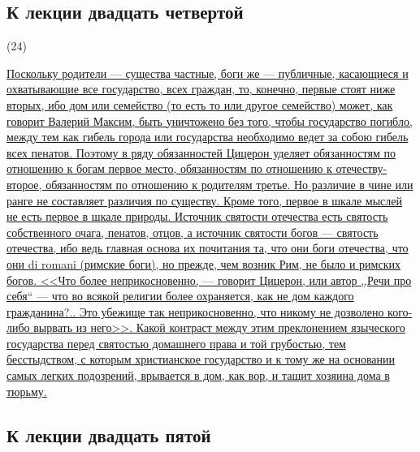 \documentclass[12pt]{article}
\begin{document}
{}
\subsection*{К лекции двадцать четвертой}

\hypertarget{24}{(24)} \hyperlink{b24}{Поскольку родители --- существа частные, боги же --- публичные, касающиеся и охватывающие все государство, всех граждан, то, конечно, первые стоят ниже вторых, ибо дом или семейство (то есть то или другое семейство) может, как говорит Валерий Максим, быть уничтожено без того, чтобы государство погибло, между тем как гибель города или государства необходимо ведет за собою гибель всех пенатов. Поэтому в ряду обязанностей Цицерон уделяет обязанностям по отношению к богам первое место, обязанностям по отношению к отечеству- второе, обязанностям по отношению к родителям третье. Но различие в чине или ранге не составляет различия по существу. Кроме того, первое в шкале мыслей не есть первое в шкале природы. Источник святости отечества есть святость собственного очага, пенатов, отцов, а источник святости богов --- святость отечества, ибо ведь главная основа их почитания та, что они боги отечества, что они di romani (римские боги), но прежде, чем возник Рим, не было и римских богов. <<Что более неприкосновенно, --- говорит Цицерон, или автор ,,Речи про себя``  --- что во всякой религии более охраняется, как не дом каждого гражданина?.. Это убежище так неприкосновенно, что никому не дозволено кого-либо вырвать из него>>. Какой контраст между этим преклонением языческого государства перед святостью домашнего права и той грубостью, тем бесстыдством, с которым христианское государство и к тому же на основании самых легких подозрений, врывается в дом, как вор, и тащит хозяина дома в тюрьму.}

{}
\subsection*{К лекции двадцать пятой}
\end{document}
